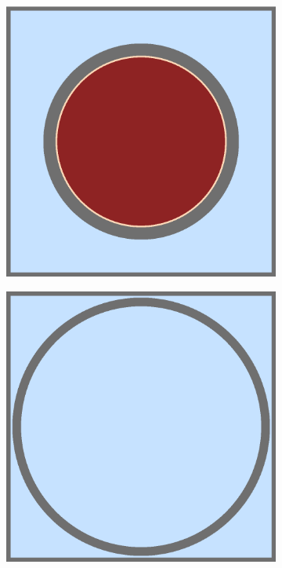 \begin{figure}[h!]
\centering
\begin{subfigure}{.5\textwidth}
  \centering
  \includegraphics[width=0.9\linewidth]{figures/benchmarks/fuel-pin-16}
  \caption{}
  \label{fig:chap7-pin-1.6}
\end{subfigure}%
\begin{subfigure}{.5\textwidth}
  \centering
  \includegraphics[width=0.9\linewidth]{figures/benchmarks/guide-tube}

\end{subfigure}
\end{figure}
